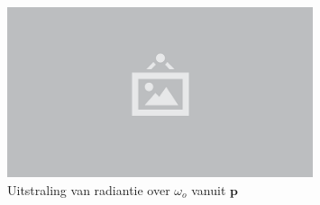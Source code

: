 \begin{figure}
  \centering
  \includegraphics[width=0.8\textwidth]{./img/raw/placeholder.png}
  \caption{Uitstraling van radiantie over $\omega_o$ vanuit $\mathbf{p}$ }
  \label{fig:sh-rendering-equation}
\end{figure}
